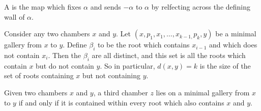 \documentclass[11pt]{article}
\begin{document}


\begin{definition}\label{fold}
    A  is the map which fixes $\alpha$ and sends $-\alpha$ to $\alpha$ by relfecting across the defining wall of $\alpha$. 
\end{definition}

\begin{proposition}
    Consider any two chambers $x$ and $y$. Let $(x,p_1,x_1,\hdots ,x_{k-1,}p_k,y)$ be a minimal gallery from $x$ to $y$. Define $\beta_i$ to be the root which contains $x_{i-1}$ and which does not contain $x_i$. Then the $\beta_i$ are all distinct, and this set is all the roots which contain $x$ but do not contain $y$. So in particular, $d(x,y)=k$ is the size of the set of roots containing $x$ but not containing $y$. 
\end{proposition}

\begin{proposition}
    Given two chambers $x$ and $y$, a third chamber $z$ lies on a minimal gallery from $x$ to $y$ if and only if it is contained within every root which also contains $x$ and $y$. 
\end{proposition}




\end{document}
